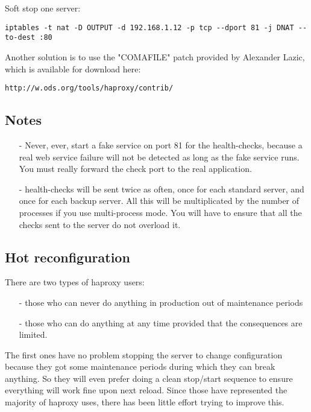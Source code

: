 Soft stop one server:
\begin{verbatim}
iptables -t nat -D OUTPUT -d 192.168.1.12 -p tcp --dport 81 -j DNAT --to-dest :80
\end{verbatim}

Another solution is to use the "COMAFILE" patch provided by Alexander Lazic,
which is available for download here:

   \verb|http://w.ods.org/tools/haproxy/contrib/|

\subsection{Notes}

\begin{itemize}
\item[-] Never, ever, start a fake service on port 81 for the health-checks, because
    a real web service failure will not be detected as long as the fake service
    runs. You must really forward the check port to the real application.

\item[-] health-checks will be sent twice as often, once for each standard server,
    and once for each backup server. All this will be multiplicated by the
    number of processes if you use multi-process mode. You will have to ensure
    that all the checks sent to the server do not overload it.
\end{itemize}

\subsection{Hot reconfiguration}

There are two types of haproxy users:
\begin{itemize}
\item[-] those who can never do anything in production out of maintenance periods
\item[-] those who can do anything at any time provided that the consequences are limited.
\end{itemize}

The first ones have no problem stopping the server to change configuration
because they got some maintenance periods during which they can break anything.
So they will even prefer doing a clean stop/start sequence to ensure everything
will work fine upon next reload. Since those have represented the majority of
haproxy uses, there has been little effort trying to improve this.

